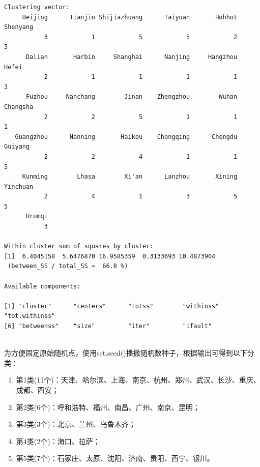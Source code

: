 \begin{enumerate}
\begin{lstlisting}
Clustering vector:
     Beijing      Tianjin Shijiazhuang      Taiyuan       Hohhot     Shenyang 
           3            1            5            5            2            5 
      Dalian       Harbin     Shanghai      Nanjing     Hangzhou        Hefei 
           2            1            1            1            1            3 
      Fuzhou     Nanchang        Jinan    Zhengzhou        Wuhan     Changsha 
           2            2            5            1            1            1 
   Guangzhou      Nanning       Haikou    Chongqing      Chengdu      Guiyang 
           2            2            4            1            1            5 
     Kunming        Lhasa        Xi'an      Lanzhou       Xining     Yinchuan 
           2            4            1            3            5            5 
      Urumqi 
           3 

Within cluster sum of squares by cluster:
[1]  6.4045158  5.6476870 16.9585359  0.3133693 10.4873904
 (between_SS / total_SS =  66.8 %)

Available components:

[1] "cluster"      "centers"      "totss"        "withinss"     "tot.withinss"
[6] "betweenss"    "size"         "iter"         "ifault"      
\end{lstlisting}
        \summary\\
        为方便固定原始随机点，使用set.seed()播撒随机数种子，根据输出可得到以下分类：
        \begin{enumerate}[label=(\arabic*)]
            \item 第1类(11个)：天津、哈尔滨、上海、南京、杭州、郑州、武汉、长沙、重庆、成都、西安；
            \item 第2类(6个)：呼和浩特、福州、南昌、广州、南京、昆明；
            \item 第3类(3个)：北京、兰州、乌鲁木齐；
            \item 第4类(2个)：海口、拉萨；
            \item 第5类(7个)：石家庄、太原、沈阳、济南、贵阳、西宁、银川。
        \end{enumerate}
    \end{enumerate}
\clearpage